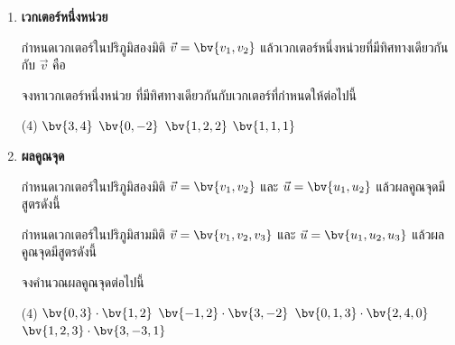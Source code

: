 \begin{enumerate}
\newpage
\item \textbf{เวกเตอร์หนึ่งหน่วย} 

กำหนดเวกเตอร์ในปริภูมิสองมิติ $\vec{v} = \bv{v_1,v_2}$ แล้วเวกเตอร์หนึ่งหน่วยที่มีทิศทางเดียวกันกับ $\vec{v}$ คือ \hrulefill

จงหาเวกเตอร์หนึ่งหน่วย ที่มีทิศทางเดียวกันกับเวกเตอร์ที่กำหนดให้ต่อไปนี้
\begin{tasks}(4)
\task $\bv{3,4}$
\task $\bv{0, -2}$
\task $\bv{1,2,2}$
\task $\bv{1,1,1}$
\end{tasks}
\vspace{50pt}

\item \textbf{ผลคูณจุด} 

กำหนดเวกเตอร์ในปริภูมิสองมิติ $\vec{v} = \bv{v_1,v_2}$ และ $\vec{u} = \bv{u_1, u_2}$ แล้วผลคูณจุดมีสูตรดังนี้ \hrulefill

กำหนดเวกเตอร์ในปริภูมิสามมิติ $\vec{v} = \bv{v_1,v_2,v_3}$ และ $\vec{u} = \bv{u_1, u_2,u_3}$ แล้วผลคูณจุดมีสูตรดังนี้ \hrulefill


จงคำนวณผลคูณจุดต่อไปนี้
\begin{tasks}(4)
\task $\bv{0,3} \cdot \bv{1,2}$
\task $\bv{-1, 2} \cdot \bv{3, -2}$
\task $\bv{0,1,3} \cdot \bv{2,4,0}$
\task $\bv{1,2,3} \cdot \bv{3,-3,1}$
\end{tasks}
\vspace{80pt}
\end{enumerate}
